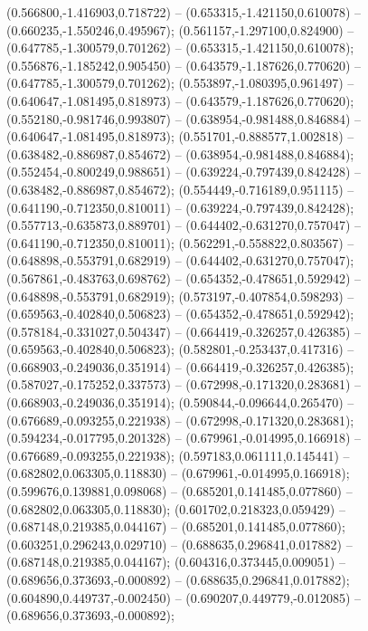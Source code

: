  (0.566800,-1.416903,0.718722) -- (0.653315,-1.421150,0.610078) -- (0.660235,-1.550246,0.495967);
 (0.561157,-1.297100,0.824900) -- (0.647785,-1.300579,0.701262) -- (0.653315,-1.421150,0.610078);
 (0.556876,-1.185242,0.905450) -- (0.643579,-1.187626,0.770620) -- (0.647785,-1.300579,0.701262);
 (0.553897,-1.080395,0.961497) -- (0.640647,-1.081495,0.818973) -- (0.643579,-1.187626,0.770620);
 (0.552180,-0.981746,0.993807) -- (0.638954,-0.981488,0.846884) -- (0.640647,-1.081495,0.818973);
 (0.551701,-0.888577,1.002818) -- (0.638482,-0.886987,0.854672) -- (0.638954,-0.981488,0.846884);
 (0.552454,-0.800249,0.988651) -- (0.639224,-0.797439,0.842428) -- (0.638482,-0.886987,0.854672);
 (0.554449,-0.716189,0.951115) -- (0.641190,-0.712350,0.810011) -- (0.639224,-0.797439,0.842428);
 (0.557713,-0.635873,0.889701) -- (0.644402,-0.631270,0.757047) -- (0.641190,-0.712350,0.810011);
 (0.562291,-0.558822,0.803567) -- (0.648898,-0.553791,0.682919) -- (0.644402,-0.631270,0.757047);
 (0.567861,-0.483763,0.698762) -- (0.654352,-0.478651,0.592942) -- (0.648898,-0.553791,0.682919);
 (0.573197,-0.407854,0.598293) -- (0.659563,-0.402840,0.506823) -- (0.654352,-0.478651,0.592942);
 (0.578184,-0.331027,0.504347) -- (0.664419,-0.326257,0.426385) -- (0.659563,-0.402840,0.506823);
 (0.582801,-0.253437,0.417316) -- (0.668903,-0.249036,0.351914) -- (0.664419,-0.326257,0.426385);
 (0.587027,-0.175252,0.337573) -- (0.672998,-0.171320,0.283681) -- (0.668903,-0.249036,0.351914);
 (0.590844,-0.096644,0.265470) -- (0.676689,-0.093255,0.221938) -- (0.672998,-0.171320,0.283681);
 (0.594234,-0.017795,0.201328) -- (0.679961,-0.014995,0.166918) -- (0.676689,-0.093255,0.221938);
 (0.597183,0.061111,0.145441) -- (0.682802,0.063305,0.118830) -- (0.679961,-0.014995,0.166918);
 (0.599676,0.139881,0.098068) -- (0.685201,0.141485,0.077860) -- (0.682802,0.063305,0.118830);
 (0.601702,0.218323,0.059429) -- (0.687148,0.219385,0.044167) -- (0.685201,0.141485,0.077860);
 (0.603251,0.296243,0.029710) -- (0.688635,0.296841,0.017882) -- (0.687148,0.219385,0.044167);
 (0.604316,0.373445,0.009051) -- (0.689656,0.373693,-0.000892) -- (0.688635,0.296841,0.017882);
 (0.604890,0.449737,-0.002450) -- (0.690207,0.449779,-0.012085) -- (0.689656,0.373693,-0.000892);

